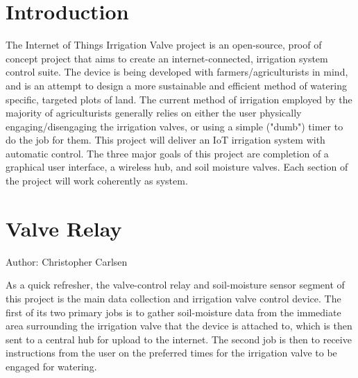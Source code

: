 \documentclass[onecolumn, draftclsnofoot,10pt, compsoc]{IEEEtran}
\begin{document}
    \section{Introduction}
        The Internet of Things Irrigation Valve project is an open-source, proof of concept project that aims to create an internet-connected, irrigation system control suite.
    The device is being developed with farmers/agriculturists in mind, and is an attempt to design a more sustainable and efficient method of watering specific, targeted plots of land.
    The current method of irrigation employed by the majority of agriculturists generally relies on either the user physically engaging/disengaging the irrigation valves, or using a simple ("dumb") timer to do the job for them.
    This project will deliver an IoT irrigation system with automatic control. 
    The three major goals of this project are completion of a graphical user interface, a wireless hub, and soil moisture valves.
    Each section of the project will work coherently as system. 
    
    \section{Valve Relay}
    Author: Christopher Carlsen
    
    As a quick refresher, the valve-control relay and soil-moisture sensor segment of this project is the main data collection and irrigation valve control device.
The first of its two primary jobs is to gather soil-moisture data from the immediate area surrounding the irrigation valve that the device is attached to, which is then sent to a central hub for upload to the internet.
The second job is then to receive instructions from the user on the preferred times for the irrigation valve to be engaged for watering.
\end{document}
